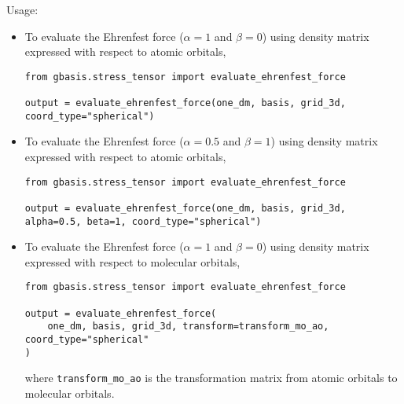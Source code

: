 \documentclass[letterpaper]{article}
\begin{document}
Usage:
\begin{itemize}
\item To evaluate the Ehrenfest force ($\alpha=1$ and $\beta=0$)
  using density matrix expressed with respect to atomic orbitals,
\begin{verbatim}
from gbasis.stress_tensor import evaluate_ehrenfest_force

output = evaluate_ehrenfest_force(one_dm, basis, grid_3d, coord_type="spherical")
\end{verbatim}
\item To evaluate the Ehrenfest force ($\alpha=0.5$ and $\beta=1$)
  using density matrix expressed with respect to atomic orbitals,
\begin{verbatim}
from gbasis.stress_tensor import evaluate_ehrenfest_force

output = evaluate_ehrenfest_force(one_dm, basis, grid_3d, alpha=0.5, beta=1, coord_type="spherical")
\end{verbatim}
\item To evaluate the Ehrenfest force ($\alpha=1$ and $\beta=0$)
  using density matrix expressed with respect to molecular orbitals,
\begin{verbatim}
from gbasis.stress_tensor import evaluate_ehrenfest_force

output = evaluate_ehrenfest_force(
    one_dm, basis, grid_3d, transform=transform_mo_ao, coord_type="spherical"
)
\end{verbatim}
  where \verb|transform_mo_ao| is the transformation matrix from atomic orbitals
  to molecular orbitals.
\end{itemize}
\end{document}

